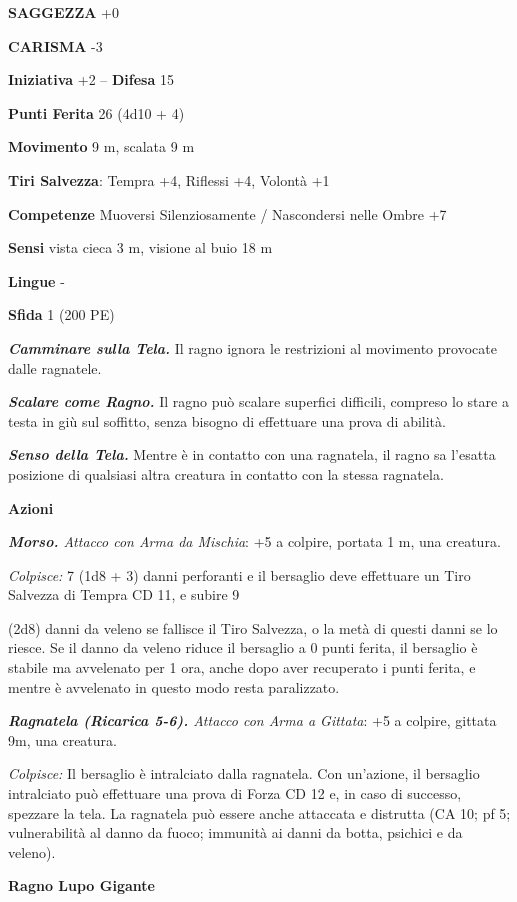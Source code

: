 \begin{multicols}{2}
\textbf{SAGGEZZA} +0

\textbf{CARISMA} -3

\textbf{Iniziativa} +2 -- \textbf{Difesa} 15

\textbf{Punti Ferita} 26 (4d10 + 4)

\textbf{Movimento} 9 m, scalata 9 m

\textbf{Tiri Salvezza}:  Tempra +4, Riflessi +4, Volontà +1 

\textbf{Competenze} Muoversi Silenziosamente / Nascondersi nelle Ombre +7

\textbf{Sensi} vista cieca 3 m, visione al buio 18 m

\textbf{Lingue} -

\textbf{Sfida} 1 (200 PE)

\emph{\textbf{Camminare sulla Tela.}} Il ragno ignora le restrizioni al movimento provocate dalle ragnatele.

\emph{\textbf{Scalare come Ragno.}} Il ragno può scalare superfici difficili, compreso lo stare a testa in giù sul soffitto, senza bisogno di effettuare una prova di abilità.

\emph{\textbf{Senso della Tela.}} Mentre è in contatto con una ragnatela, il ragno sa l'esatta posizione di qualsiasi altra creatura in contatto con la stessa ragnatela. 

\textbf{Azioni}

\emph{\textbf{Morso.} Attacco con Arma da Mischia}: +5 a colpire, portata 1 m, una creatura.

\emph{Colpisce:} 7 (1d8 + 3) danni perforanti e il bersaglio deve effettuare un Tiro Salvezza di Tempra CD 11, e subire 9

(2d8) danni da veleno se fallisce il Tiro Salvezza, o la metà di questi danni se lo riesce. Se il danno da veleno riduce il bersaglio a 0 punti ferita, il bersaglio è stabile ma avvelenato per 1 ora, anche dopo aver recuperato i punti ferita, e mentre è avvelenato in questo modo resta paralizzato.

\emph{\textbf{Ragnatela (Ricarica 5-6).} Attacco con Arma a Gittata}: +5 a colpire, gittata 9m, una creatura.

\emph{Colpisce:} Il bersaglio è intralciato dalla ragnatela. Con un'azione, il bersaglio intralciato può effettuare una prova di Forza CD 12 e, in caso di successo, spezzare la tela. La ragnatela può essere anche attaccata e distrutta (CA 10; pf 5; vulnerabilità al danno da fuoco; immunità ai danni da botta, psichici e da veleno). 

\medskip\textbf{Ragno Lupo Gigante}


\end{multicols}
